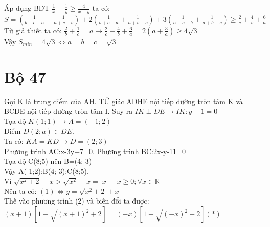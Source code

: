 \hda 
Áp dụng BĐT $\frac{1}{x}+\frac{1}{y}\geq \frac{4}{x+y}$ ta có:\\ 
$S=\left ( \frac{1}{b+c-a}+\frac{1}{a+c-b} \right )+2\left ( \frac{1}{b+c-a}+\frac{1}{a+b-c} \right )+3\left ( \frac{1}{a+c-b}+\frac{1}{a+b-c} \right )\geq \frac{2}{c}+\frac{4}{b}+\frac{6}{a}$\\
Từ giả thiết ta có: $\frac{2}{b}+\frac{1}{c}=a\rightarrow \frac{2}{c}+\frac{4}{b}+\frac{6}{a}=2\left ( a+\frac{3}{a} \right )\geq 4\sqrt{3}$\\
Vậy $S_{min}=4\sqrt{3}\Leftrightarrow a=b=c=\sqrt{3}$\\
\section{Bộ 47}
\hda  
Gọi K là trung điểm của AH. TỨ giác ADHE nội tiếp đường tròn tâm K và BCDE nội tiếp đường tròn tâm I. Suy ra $IK\perp DE$$\rightarrow IK:y-1=0$\\

Tọa độ $K\left ( 1;1 \right )\rightarrow A=\left ( -1;2 \right )$\\
Điểm $D\left ( 2;a \right )\in DE$.\\
Ta có: $KA=KD\rightarrow D=\left ( 2;3 \right )$\\
Phương trình AC:x-3y+7=0. Phương trình BC:2x-y-11=0\\
Tọa độ C(8;5) nên B=(4;-3)\\
Vậy A(-1;2);B(4;-3);C(8;5).\\

\hda  
Vì $\sqrt{x^{2}+2}-x> \sqrt{x^{2}}-x= \left | x \right |-x\geq 0;\forall x\in \mathbb{R}$\\
Nên ta có: $\left ( 1 \right )\Leftrightarrow y=\sqrt{x^{2}+2}+x$\\

Thế vào phương trình (2) và biến đổi ta được:\\
$\left ( x+1 \right )\left [ 1+\sqrt{\left ( x+1 \right )^{2}+2} \right ]=\left ( -x \right )\left [ 1+\sqrt{\left ( -x \right )^{2}+2} \right ](\ast )$\\


